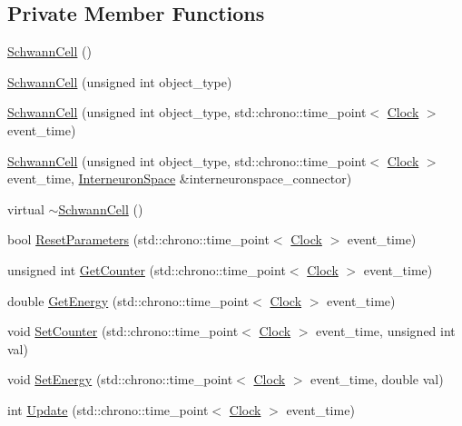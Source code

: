 \subsection*{Private Member Functions}
\begin{DoxyCompactItemize}
\item 
\mbox{\hyperlink{classSchwannCell_aab3414e0d6266c5b791a000c39359ca5}{Schwann\+Cell}} ()
\item 
\mbox{\hyperlink{classSchwannCell_a1387a5d8b87e485a507c72a657ab2864}{Schwann\+Cell}} (unsigned int object\+\_\+type)
\item 
\mbox{\hyperlink{classSchwannCell_ad8e9f6343a3617a44d8a03e4edbc92d6}{Schwann\+Cell}} (unsigned int object\+\_\+type, std\+::chrono\+::time\+\_\+point$<$ \mbox{\hyperlink{universe_8h_a0ef8d951d1ca5ab3cfaf7ab4c7a6fd80}{Clock}} $>$ event\+\_\+time)
\item 
\mbox{\hyperlink{classSchwannCell_abaa1caff5e245ede16a538d1e1bcc1e7}{Schwann\+Cell}} (unsigned int object\+\_\+type, std\+::chrono\+::time\+\_\+point$<$ \mbox{\hyperlink{universe_8h_a0ef8d951d1ca5ab3cfaf7ab4c7a6fd80}{Clock}} $>$ event\+\_\+time, \mbox{\hyperlink{classInterneuronSpace}{Interneuron\+Space}} \&interneuronspace\+\_\+connector)
\item 
virtual \mbox{\hyperlink{classSchwannCell_af98a51e1f9c191bb57282dbbb16dd2a9}{$\sim$\+Schwann\+Cell}} ()
\item 
bool \mbox{\hyperlink{classSchwannCell_af60de27e9658b2ca9973931c2175fe74}{Reset\+Parameters}} (std\+::chrono\+::time\+\_\+point$<$ \mbox{\hyperlink{universe_8h_a0ef8d951d1ca5ab3cfaf7ab4c7a6fd80}{Clock}} $>$ event\+\_\+time)
\item 
unsigned int \mbox{\hyperlink{classSchwannCell_ab43faeb8f76529162985b2a0c53eb3f5}{Get\+Counter}} (std\+::chrono\+::time\+\_\+point$<$ \mbox{\hyperlink{universe_8h_a0ef8d951d1ca5ab3cfaf7ab4c7a6fd80}{Clock}} $>$ event\+\_\+time)
\item 
double \mbox{\hyperlink{classSchwannCell_af6dd3963bc46763b34f2ee742a4c9fae}{Get\+Energy}} (std\+::chrono\+::time\+\_\+point$<$ \mbox{\hyperlink{universe_8h_a0ef8d951d1ca5ab3cfaf7ab4c7a6fd80}{Clock}} $>$ event\+\_\+time)
\item 
void \mbox{\hyperlink{classSchwannCell_a067f87983cb937d5fdb882c267e27921}{Set\+Counter}} (std\+::chrono\+::time\+\_\+point$<$ \mbox{\hyperlink{universe_8h_a0ef8d951d1ca5ab3cfaf7ab4c7a6fd80}{Clock}} $>$ event\+\_\+time, unsigned int val)
\item 
void \mbox{\hyperlink{classSchwannCell_aadc0a342e29ccacbd8686b9431fb41c6}{Set\+Energy}} (std\+::chrono\+::time\+\_\+point$<$ \mbox{\hyperlink{universe_8h_a0ef8d951d1ca5ab3cfaf7ab4c7a6fd80}{Clock}} $>$ event\+\_\+time, double val)
\item 
int \mbox{\hyperlink{classSchwannCell_a765280afc21c2546ad6162db46089d40}{Update}} (std\+::chrono\+::time\+\_\+point$<$ \mbox{\hyperlink{universe_8h_a0ef8d951d1ca5ab3cfaf7ab4c7a6fd80}{Clock}} $>$ event\+\_\+time)
\end{DoxyCompactItemize}
